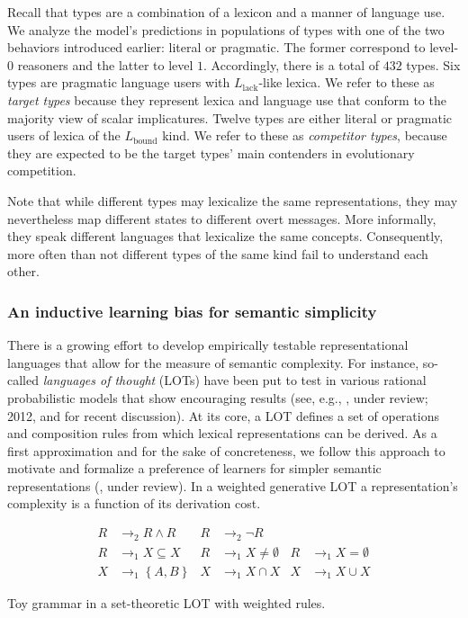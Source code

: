 \documentclass[a4paper, 11pt]{article}
\theoremstyle{Satz}
\newcommand{\set}[1]{\left\{#1\right\}}
\newcommand{\mylang}[1]{\ensuremath{L_{\text{#1}}}\xspace} %
\newcommand{\Lbound}{\mylang{bound}}
\newcommand{\Llack}{\mylang{lack}}
\begin{document}
Recall that types are a combination of a lexicon and a manner of language use. We analyze the
model's predictions in populations of types with one of the two behaviors introduced earlier:
literal or pragmatic. The former correspond to level-$0$ reasoners and the latter to level $1$. Accordingly, there is a total of $432$ types. Six types are pragmatic language
users with $\Llack$-like lexica. We refer to these as \emph{target types} because they
represent lexica and language use that conform to the majority view of scalar
implicatures. Twelve types are either literal or pragmatic users of lexica of the
$\Lbound$ kind. We refer to these as \emph{competitor types}, because they are expected to be
the target types' main contenders in evolutionary competition. 

Note that while
different types may lexicalize the same representations, they may nevertheless map different
states to different overt messages. More informally, they speak different languages that
lexicalize the same concepts. Consequently, more often than not different types of the same
kind fail to understand each other.




\subsubsection{An inductive learning bias for semantic simplicity}
\label{sec:an-induct-learn}

There is a growing effort to develop empirically testable representational languages that allow
for the measure of semantic complexity. For instance, so-called {\em languages of thought}
(LOTs) have been put to test in various rational probabilistic models that show encouraging
results (see, e.g., \citealt{katz+etal:2008}, \citeauthor{piantadosi+etal:underreview} under review; 2012, and \citealt{piantadosi+jacobs:2016} for recent discussion). At its
core, a LOT defines a set of operations and composition rules from which lexical representations can be
derived. As a first approximation and for the sake of concreteness, we follow this approach to
motivate and formalize a preference of learners for simpler semantic representations
(\citealt{feldman:2000, chater+vitanyi:2003, piantadosi+etal:2012a,kirby+etal:2015}, \citeauthor{piantadosi+etal:underreview} under review). 
In a weighted generative LOT a representation's complexity is a function of its derivation cost.

\begin{table}
  \centering
  \begin{align*}
    R & \rightarrow_2 R \wedge R 
    & R & \rightarrow_2 \neg R  \\ 
    R & \rightarrow_1 X \subseteq X &
    R & \rightarrow_1 X \neq \emptyset &
    R & \rightarrow_1 X = \emptyset  \\
    X & \rightarrow_1 \set{A,B} & 
    X & \rightarrow_1 X \cap X & 
    X & \rightarrow_1 X \cup X    
  \end{align*}
  \caption{Toy grammar in a set-theoretic LOT with weighted rules.}
  \label{tab:grammar}
\end{table}
\end{document}
